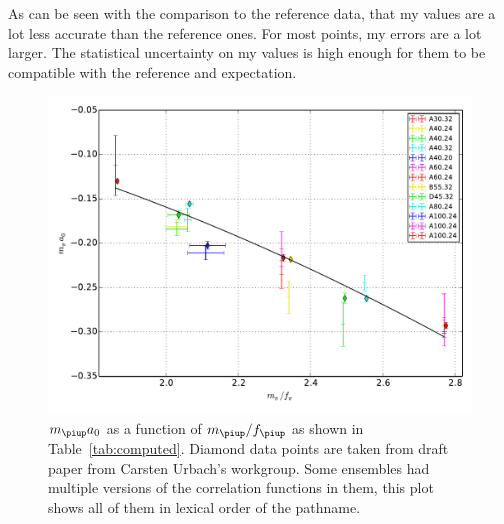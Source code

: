 \documentclass[11pt, english, fleqn, DIV=10, headinclude]{scrartcl}
\newcommand\mpi{m_{\piup}}
\begin{document}
As can be seen with the comparison to the reference data, that my values are a
lot less accurate than the reference ones. For most points, my errors are a lot
larger. The statistical uncertainty on my values is high enough for them to be
compatible with the reference and expectation.

\begin{figure}[htbp]
    \centering
    \includegraphics[width=\linewidth]{plots/result.pdf}
    \caption{%
        $\mpi a_0$ as a function of $\mpi/f_\piup$ as shown in
        Table~\ref{tab:computed}. Diamond data points are taken from draft
        paper from Carsten Urbach's workgroup. Some ensembles had multiple
        versions of the correlation functions in them, this plot shows all of
        them in lexical order of the pathname.
    }
    \label{fig:result}
\end{figure}

\clearpage
\end{document}
